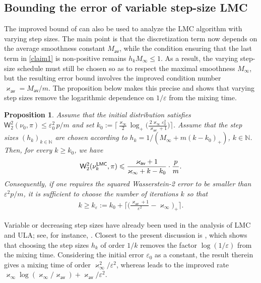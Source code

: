 \documentclass[aos,reqno]{imsart}
\def\wass{\mathsf{W}}
\def\kappav{\varkappa_{\textsf{av}}}
\def\kappamax{\varkappa_{\infty}}
\def\Mav{M_{\textsf{av}}}
\def\Mmax{M_{\infty}}
\newtheorem{proposition}{Proposition}
\theoremstyle{definition}
\begin{document}
\subsection{Bounding the error of variable step-size LMC}

The improved bound of  can also be used to
analyze the LMC algorithm with varying step sizes. The
main point is that the discretization term now depends
on the average smoothness constant $\Mav$, while the
condition ensuring that the last term in \eqref{claim1}
is non-positive remains $h_k\Mmax\leqslant 1$. As a
result, the varying step-size schedule must still be
chosen so as to respect the maximal smoothness
$\Mmax$, but the resulting error bound involves the
improved condition number $\kappav=\Mav/m$. The
proposition below makes this precise and shows that 
varying step sizes remove the logarithmic dependence 
on $1/\varepsilon$ from the mixing time.

\begin{proposition}\label{prop:VSS}
Assume that the initial distribution satisfies
$\wass_2^2(\nu_0,\pi)\leqslant \varepsilon_0^2\,
{p}/{m}$ and set $k_0:= \big\lceil
\frac{\kappamax}{2} \log_+\big( \frac{2\kappamax
\varepsilon_0^2}{\kappav+1}\big)\big\rceil$. 
Assume that the step sizes $(h_k)_{k\in\mathbb N}$ 
are chosen according to  $h_k=1/({\Mmax+m(k-k_0 
)_+})$, $k\in\mathbb N$. Then, for every $k 
\geqslant k_0$, we have
\begin{align}\label{W2VS}
    \wass_2^2(\nu_k^{\sf LMC},\pi)
    \leqslant
    \frac{\kappav+1}{\kappamax+k-k_0}\cdot\frac{p}{m}.
\end{align}
Consequently, if one requires the squared Wasserstein-2
error to be smaller than $\varepsilon^2 p/m$, it is
sufficient to choose the number of iterations $k$ so that
\begin{align}\label{kVS}
    k\geqslant k_\varepsilon:= k_0+ \Big\lceil
    \Big(\frac{\kappav+1}{\varepsilon^2}-\kappamax
    \Big)_+ \Big\rceil.
\end{align}
\end{proposition}
Variable or decreasing step sizes have already been used
in the analysis of LMC and ULA; see, for instance,
\citep{durmus2017}. Closest to the present
discussion is \citep[Theorem 2]{dalalyan2019user}, which
shows that choosing the step sizes $h_k$ of order $1/k$
removes the factor $\log(1/\varepsilon)$ from the mixing
time. Considering the initial error $\varepsilon_0$ as a
constant, the result therein gives a mixing time of order
$\kappamax^2/\varepsilon^2$, whereas 
leads to the improved rate $\kappamax\log(\kappamax/
\kappav) + \kappav/\varepsilon^2$.
\end{document}
